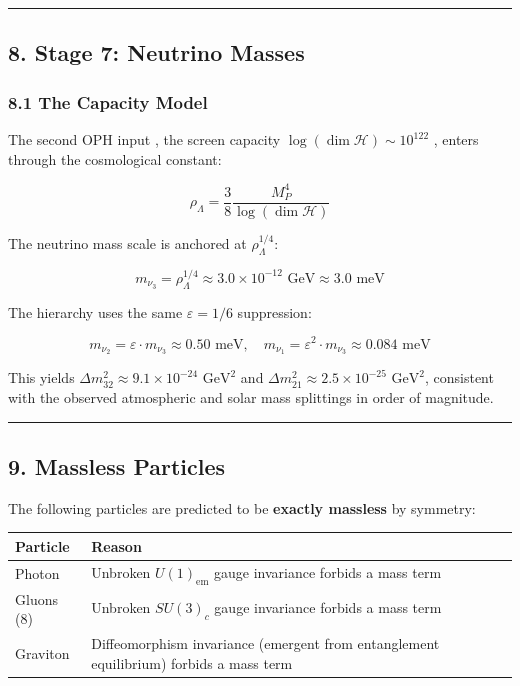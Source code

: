\begin{center}\rule{0.5\linewidth}{0.5pt}\end{center}

\subsection{8. Stage 7: Neutrino Masses}\label{8-stage-7-neutrino-masses}

\subsubsection{8.1 The Capacity Model}\label{81-the-capacity-model}

The second OPH input , the screen capacity \(\log(\dim\mathcal{H}) \sim 10^{122}\) , enters through the cosmological constant:

\[\rho_\Lambda = \frac{3}{8} \frac{M_P^4}{\log(\dim\mathcal{H})}\]

The neutrino mass scale is anchored at \(\rho_\Lambda^{1/4}\):

\[m_{\nu_3} = \rho_\Lambda^{1/4} \approx 3.0 \times 10^{-12} \text{ GeV} \approx 3.0 \text{ meV}\]

The hierarchy uses the same \(\varepsilon = 1/6\) suppression:

\[m_{\nu_2} = \varepsilon \cdot m_{\nu_3} \approx 0.50 \text{ meV}, \quad m_{\nu_1} = \varepsilon^2 \cdot m_{\nu_3} \approx 0.084 \text{ meV}\]

This yields \(\Delta m_{32}^2 \approx 9.1 \times 10^{-24} \text{ GeV}^2\) and \(\Delta m_{21}^2 \approx 2.5 \times 10^{-25} \text{ GeV}^2\), consistent with the observed atmospheric and solar mass splittings in order of magnitude.

\begin{center}\rule{0.5\linewidth}{0.5pt}\end{center}

\subsection{9. Massless Particles}\label{9-massless-particles}

The following particles are predicted to be \textbf{exactly massless} by symmetry:

{\def\LTcaptype{none} %
\begin{longtable}[]{@{}ll@{}}
\toprule\noalign{}
Particle & Reason \\
\midrule\noalign{}
\endhead
\bottomrule\noalign{}
\endlastfoot
Photon & Unbroken \(U(1)_{\text{em}}\) gauge invariance forbids a mass term \\
Gluons (8) & Unbroken \(SU(3)_c\) gauge invariance forbids a mass term \\
Graviton & Diffeomorphism invariance (emergent from entanglement equilibrium) forbids a mass term \\
\end{longtable}
}

